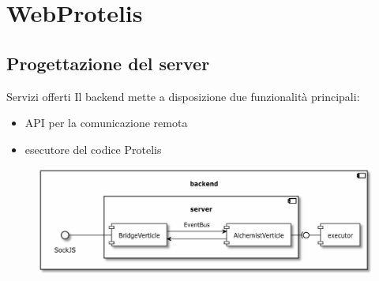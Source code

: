 \section{WebProtelis}


  \subsection{Progettazione del server}

    \begin{frame}{\insertsectionhead}{\insertsubsectionhead}
      \begin{block}{Servizi offerti}
        Il backend mette a disposizione due funzionalità principali:
        \begin{itemize}
          \item API per la comunicazione remota
          \item esecutore del codice Protelis
        \end{itemize}
      \end{block}
      \begin{figure}
        \includegraphics[width=.67\textwidth]{res/uml/architecture-design-server.eps}
      \end{figure}
    \end{frame}

